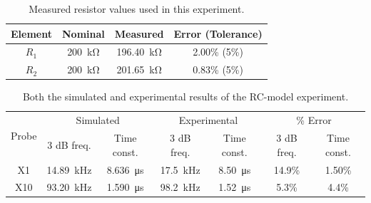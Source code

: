 \documentclass{report}
\begin{document}
\begin{table}[H]
	\centering
	\caption{Measured resistor values used in this experiment.}
	\begin{threeparttable}
		\label{table:4actual}
		\begin{tabular}{cccc}
			\toprule
			Element & Nominal & Measured & Error (Tolerance) \\
			\midrule
			$R_1$ & \SI{200}{\kohm} & \SI{196.40}{\kohm} & 2.00\% (5\%) \\
			$R_2$ & \SI{200}{\kohm} & \SI{201.65}{\kohm} & 0.83\% (5\%) \\
			\bottomrule
		\end{tabular}
	\end{threeparttable}
\end{table}
\begin{table}[H]
	\centering
	\caption{Both the simulated and experimental results of the RC-model experiment.}
	\begin{threeparttable}
		\label{table:1x10xresults}
		\begin{tabular}{c|cc|cc|cc}
			\toprule
			\multirow{2}{*}{Probe} & \multicolumn{2}{c|}{Simulated} & \multicolumn{2}{c|}{Experimental} & \multicolumn{2}{c}{\% Error} \\
			& 3 dB freq. & Time const. & 3 dB freq. & Time const. & 3 dB freq. & Time const. \\
			\midrule
			X1  & \SI{14.89}{\kHz} & \SI{8.636}{\us} & \SI{17.5}{\kHz} & \SI{8.50}{\us} & 14.9\% & 1.50\% \\
			X10 & \SI{93.20}{\kHz} & \SI{1.590}{\us} & \SI{98.2}{\kHz} & \SI{1.52}{\us} & 5.3\% & 4.4\% \\
			\bottomrule
		\end{tabular}
	\end{threeparttable}
\end{table}

\pagebreak
\hspace{0pt}
\vfill
\end{document}
